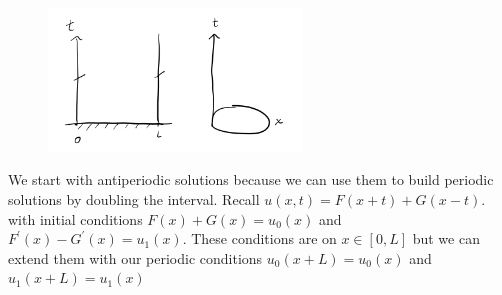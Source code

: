 \documentclass[11pt,a4paper]{article}
\begin{document}
\begin{figure}[H]
	\centering
	\includegraphics[width=0.6\textwidth]{pbc.png} %
\end{figure}

We start with antiperiodic solutions because we can use them to build periodic solutions by doubling the interval. Recall $u(x,t) = F(x+t)+G(x-t)$. with initial conditions $F(x)+G(x) = u_{0}(x)$ and $F^{\prime}(x)-G^{\prime}(x)= u_{1}(x)$. These conditions are on $x\in[0,L]$ but we can extend them with our periodic conditions $u_{0}(x+L) = u_{0}(x)$ and $u_{1}(x+L) = u_{1}(x)$
\end{document}
